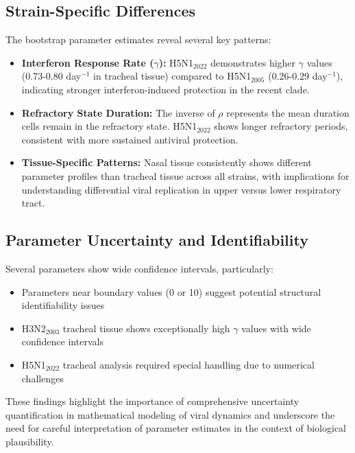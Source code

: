 \documentclass[12pt]{article}
\begin{document}
\subsection{Strain-Specific Differences}
The bootstrap parameter estimates reveal several key patterns:

\begin{itemize}
    \item \textbf{Interferon Response Rate ($\gamma$):} H5N1$_{2022}$ demonstrates higher $\gamma$ values (0.73-0.80 day$^{-1}$ in tracheal tissue) compared to H5N1$_{2005}$ (0.26-0.29 day$^{-1}$), indicating stronger interferon-induced protection in the recent clade.
    
    \item \textbf{Refractory State Duration:} The inverse of $\rho$ represents the mean duration cells remain in the refractory state. H5N1$_{2022}$ shows longer refractory periods, consistent with more sustained antiviral protection.
    
    \item \textbf{Tissue-Specific Patterns:} Nasal tissue consistently shows different parameter profiles than tracheal tissue across all strains, with implications for understanding differential viral replication in upper versus lower respiratory tract.
\end{itemize}

\subsection{Parameter Uncertainty and Identifiability}
Several parameters show wide confidence intervals, particularly:
\begin{itemize}
    \item Parameters near boundary values (0 or 10) suggest potential structural identifiability issues
    \item H3N2$_{2003}$ tracheal tissue shows exceptionally high $\gamma$ values with wide confidence intervals
    \item H5N1$_{2022}$ tracheal analysis required special handling due to numerical challenges
\end{itemize}

These findings highlight the importance of comprehensive uncertainty quantification in mathematical modeling of viral dynamics and underscore the need for careful interpretation of parameter estimates in the context of biological plausibility.
\end{document}
